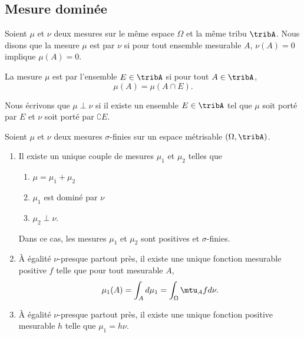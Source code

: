 \subsection{Mesure dominée}

Soient \( \mu\) et \( \nu\) deux mesures sur le même espace \( \Omega\) et la même tribu \( \tribA\). Nous disons que la mesure \( \mu\) est \cite{PersoFeng} par \( \nu\) si pour tout ensemble mesurable \( A\), \( \nu(A)=0\) implique \( \mu(A)=0\).

La mesure \( \mu\) est  par l'ensemble \( E\in\tribA\) si pour tout \( A\in\tribA\), 
\begin{equation}
    \mu(A)=\mu(A\cap E).
\end{equation}

Nous écrivons que \( \mu\perp\nu\) si il existe un ensemble \( E\in\tribA\) tel que \( \mu\) soit porté par \( E\) et \( \nu\) soit porté par \( \complement E\).

\begin{theorem}
    Soient \( \mu\) et \( \nu\) deux mesures \( \sigma\)-finies sur un espace métrisable \( (\Omega,\tribA)\).
    \begin{enumerate}
        \item
            Il existe un unique couple de mesures \( \mu_1\) et \( \mu_2\) telles que
            \begin{enumerate}
                \item
                    \( \mu=\mu_1+\mu_2\)
                \item
                    \( \mu_1\) est dominé par \( \nu\)
                \item
                    \( \mu_2\perp \nu\).
            \end{enumerate}
            Dans ce cas, les mesures \( \mu_1\) et \( \mu_2\) sont positives et \( \sigma\)-finies.
        \item
            À égalité \(  \nu\)-presque partout près, il existe une unique fonction mesurable positive \( f\) telle que pour tout mesurable \( A\),
            \begin{equation}
                \mu_1(A)=\int_Ad\mu_1=\int_{\Omega}\mtu_Afd \nu.
            \end{equation}
        \item
            À égalité \( \nu\)-presque partout près, il existe une unique fonction positive mesurable \( h\) telle que \( \mu_1=h\nu\).
    \end{enumerate}
\end{theorem}



